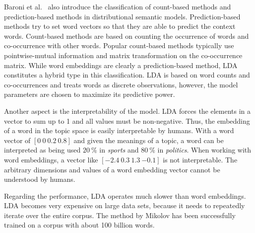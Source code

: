 \documentclass{sig-alternate-05-2015}
\begin{document}
Baroni et al.~\cite{Baroni2014} also introduce the classification of count-based methods and prediction-based methods in distributional semantic models.
Prediction-based methods try to set word vectors so that they are able to predict the context words.
Count-based methods are based on counting the occurrence of words and co-occurrence with other words.
Popular count-based methods typically use pointwise-mutual information and matrix transformation on the co-occurrence matrix.
While word embeddings are clearly a prediction-based method, LDA constitutes a hybrid type in this classification.
LDA is based on word counts and co-occurrences and treats words as discrete observations, however, the model parameters are chosen to maximize its predictive power.

Another aspect is the interpretability of the model.
LDA forces the elements in a vector to sum up to 1 and all values must be non-negative.
Thus, the embedding of a word in the topic space is easily interpretable by humans.
With a word vector of $[0~0~0.2~0.8]$ and given the meanings of a topic, a word can be interpreted as being used $20~\%$ in \emph{sports} and $80~\%$ in \emph{politics}.
When working with word embeddings, a vector like $[{-2.4}~0.3~1.3~{-0.1}]$ is not interpretable.
The arbitrary dimensions and values of a word embedding vector cannot be understood by humans.

Regarding the performance, LDA operates much slower than word embeddings.
LDA becomes very expensive on large data sets, because it needs to repeatedly iterate over the entire corpus.
The method by Mikolov has been successfully trained on a corpus with about 100 billion words.

\end{document}

